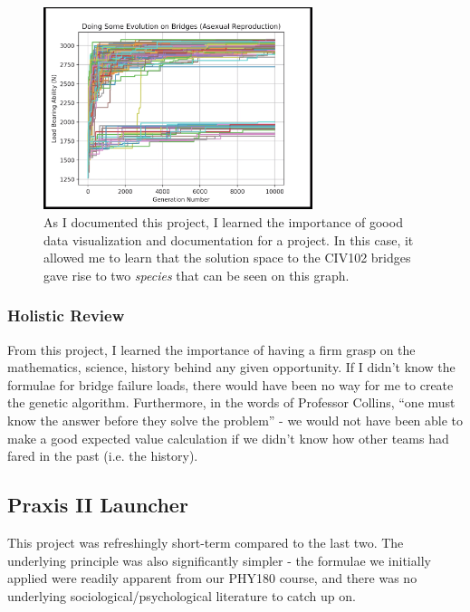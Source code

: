 \documentclass[a4paper,12pt]{article}
\begin{document}
\begin{figure}[H]
\centering
\includegraphics[width=0.7\textwidth]{img/image006.png}
\caption{As I documented this project, I learned the importance of goood data visualization and documentation for a project. In this case, it allowed me to learn that the solution space to the CIV102 bridges gave rise to two \textit{species} that can be seen on this graph.}
\label{}
\end{figure}

\subsubsection{Holistic Review}
From this project, I learned the importance of having a firm grasp on the {mathematics, science, history} behind any given opportunity. If I didn’t know the formulae for bridge failure loads, there would have been no way for me to create the genetic algorithm. Furthermore, in the words of Professor Collins, “one must know the answer before they solve the problem” - we would not have been able to make a good expected value calculation if we didn’t know how other teams had fared in the past (i.e. the history).

\subsection{Praxis II Launcher}
\label{sec:launch}
This project was refreshingly short-term compared to the last two. The underlying principle was also significantly simpler - the formulae we initially applied were readily apparent from our PHY180 course, and there was no underlying sociological/psychological literature to catch up on.
\end{document}
